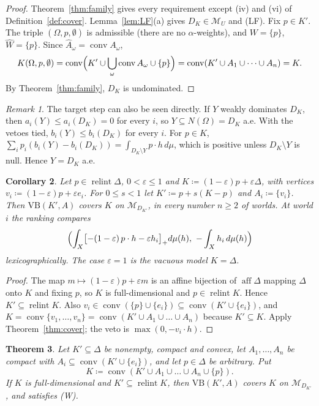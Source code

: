 \documentclass[11pt]{article}
\newcommand{\M}{\mathcal{M}}
\newcommand{\VB}{\mathrm{VB}}
\DeclareMathOperator{\conv}{conv}
\DeclareMathOperator{\relint}{relint}
\DeclareMathOperator{\aff}{aff}
\theoremstyle{plain}
\newtheorem{theorem}{Theorem}[section]
\newtheorem{corollary}[theorem]{Corollary}
\theoremstyle{definition}
\theoremstyle{remark}
\newtheorem{remark}[theorem]{Remark}
\begin{document}
\begin{proof}
Theorem~\ref{thm:family} gives every requirement except (iv) and (vi) of
Definition~\ref{def:cover}. Lemma~\ref{lem:LF}(a) gives $D_K\in\M_U$ and (LF). Fix $p\in
K'$. The triple $(\Omega,p,\emptyset)$ is admissible (there are no $\alpha$-weights), and
$W=\{p\}$, $\hat W=\{p\}$. Since $\hat A_\omega=\conv A_\omega$,
\[
  K(\Omega,p,\emptyset)=\conv\Bigl(K'\cup\bigcup_\omega\conv A_\omega\cup\{p\}\Bigr)
  =\conv(K'\cup A_1\cup\dots\cup A_n)=K .
\]
By Theorem~\ref{thm:family}, $D_K$ is undominated.
\end{proof}

\begin{remark}\label{rem:direct}
The target step can also be seen directly. If $Y$ weakly dominates $D_K$, then
$a_i(Y)\le a_i(D_K)=0$ for every $i$, so $Y\subseteq N(\Omega)=D_K$ a.e. With the vetoes
tied, $b_i(Y)\le b_i(D_K)$ for every $i$. For $p\in K$, $\sum_ip_i(b_i(Y)-b_i(D_K))=
\int_{D_K\setminus Y}p\cdot h\,d\mu$, which is positive unless $D_K\setminus Y$ is null.
Hence $Y=D_K$ a.e.
\end{remark}

\begin{corollary}\label{cor:contam}
Let $p\in\relint\Delta$, $0<\varepsilon\le1$ and $K\coloneqq(1-\varepsilon)p+
\varepsilon\Delta$, with vertices $v_i\coloneqq(1-\varepsilon)p+\varepsilon e_i$. For
$0\le s<1$ let $K'\coloneqq p+s(K-p)$ and $A_i\coloneqq\{v_i\}$. Then $\VB(K',A)$ covers
$K$ on $\M_{D_{K'}}$, in every number $n\ge2$ of worlds. At world $i$ the ranking compares
\[
  \Bigl(\int_X\bigl[-(1-\varepsilon)\,p\cdot h-\varepsilon h_i\bigr]_+d\mu(h),\
  -\int_Xh_i\,d\mu(h)\Bigr)
\]
lexicographically. The case $\varepsilon=1$ is the vacuous model $K=\Delta$.
\end{corollary}

\begin{proof}
The map $m\mapsto(1-\varepsilon)p+\varepsilon m$ is an affine bijection of $\aff\Delta$
mapping $\Delta$ onto $K$ and fixing $p$, so $K$ is full-dimensional and $p\in\relint K$.
Hence $K'\subseteq\relint K$. Also $v_i\in\conv(\{p\}\cup\{e_i\})\subseteq\conv(K'\cup
\{e_i\})$, and $K=\conv\{v_1,\dots,v_n\}=\conv(K'\cup A_1\cup\dots\cup A_n)$ because
$K'\subseteq K$. Apply Theorem~\ref{thm:cover}; the veto is $\max(0,-v_i\cdot h)$.
\end{proof}

\begin{theorem}\label{thm:exempt}
Let $K'\subseteq\Delta$ be nonempty, compact and convex, let $A_1,\dots,A_n$ be compact
with $A_i\subseteq\conv(K'\cup\{e_i\})$, and let $p\in\Delta$ be arbitrary. Put
\[
  K\coloneqq\conv(K'\cup A_1\cup\dots\cup A_n\cup\{p\}).
\]
If $K$ is full-dimensional and $K'\subseteq\relint K$, then $\VB(K',A)$ covers $K$ on
$\M_{D_{K'}}$, and satisfies (W).
\end{theorem}
\end{document}
